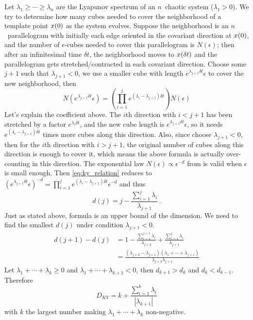 Let $\lambda_1 \ge \cdots \ge \lambda_n$
are the Lyapunov spectrum
of an $n$\dmn\ chaotic system ($\lambda_1 > 0$). We try to
determine how many cubes needed to cover the neighborhood of a template
point $x(0)$ as the system evolves. Suppose the neighborhood is an
$n$\dmn\ parallelogram with initially each edge oriented in the covariant
direction at $x(0)$, and the number of $\epsilon$-cubes needed
to cover this parallelogram is $N(\epsilon)$; then after an infinitesimal
time $\delta t$, the neighborhood moves to $x(\delta t)$ and the parallelogram
gets stretched/contracted in each covariant direction.
Choose some $j+1$ such that
$\lambda_{j+1} < 0$, we use a smaller cube with length
$e^{\lambda_{j+1} \delta t}\epsilon$ to cover the new neighborhood, then
\begin{equation}
N(e^{\lambda_{j+1} \delta t}\epsilon) =
\left( \prod_{i=1}^{j} e^{(\lambda_i - \lambda_{j+1})\delta t}\right)
N(\epsilon)
\label{eq:ky_relation}
\end{equation}
Let's explain the coefficient above. The $i$th direction with $i<j+1$
has been stretched by a factor $e^{\lambda_i \delta t}$, and the
new cube length is $e^{\lambda_{j+1} \delta t}\epsilon$, so it needs
$e^{(\lambda_i - \lambda_{j+1})\delta t}$ times more cubes along this direction.
Also, since choose $\lambda_{j+1} < 0$, then for the $i$th direction
with $i > j+1$, the original number of cubes along this direction
is enough to cover it, which means the above formula is actually
over-counting in this direction. The exponential law
$N(\epsilon) \propto \epsilon^{-d}$ from  is valid
when $\epsilon$ is small enough. Then \eqref{eq:ky_relation} reduces to
$(e^{\lambda_{j+1} \delta t}\epsilon)^{-d}  =
\prod_{i=1}^{j} e^{(\lambda_i - \lambda_{j+1})\delta t} \epsilon^{-d}$ and thus
\begin{equation}
  d(j) = j - \frac{\sum_{i=1}^{j} \lambda_i}{\lambda_{j+1}}
  \,.
  \label{eq:ky1}
\end{equation}
Just as stated above, formula  is an upper bound of the dimension.
We need to find the smallest $d(j)$ under condition $\lambda_{j+1} < 0$.
\begin{align*}
  d(j+1) - d(j) &= 1 -\frac{\sum_{i=1}^{j+1} \lambda_i}{\lambda_{j+2}}
  + \frac{\sum_{i=1}^{j} \lambda_i}{\lambda_{j+1}} \\
  & = \frac{(\lambda_{j+2} - \lambda_{j+1})(\lambda_1 + \cdots + \lambda_{j+1})}
  {\lambda_{j+2}\lambda_{j+1}}
\end{align*}
Let $\lambda_1 + \cdots + \lambda_k \ge 0$ and
$\lambda_1 + \cdots + \lambda_{k+1} < 0$, then $d_{k+1} > d_{k}$ and
$d_k < d_{k-1}$. Therefore
\begin{equation}
  D_{KY} = k + \frac{\sum_{i=1}^{k} \lambda_i}{|\lambda_{k+1}|}
  \label{eq:ky2}
\end{equation}
with $k$ the largest number making $\lambda_1 + \cdots + \lambda_k$
non-negative.


